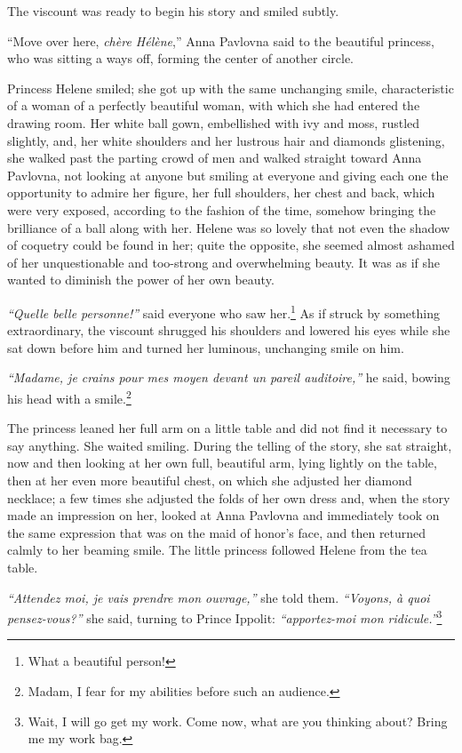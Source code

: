 The viscount was ready to begin his story and smiled subtly.

``Move over here, \textit{ch\`ere H\'el\`ene},'' Anna Pavlovna said to
the beautiful princess, who was sitting a ways off, forming the center
of another circle.

Princess Helene smiled; she got up with the same unchanging smile,
characteristic of a woman of a perfectly beautiful woman, with which
she had entered the drawing room. Her white ball gown, embellished
with ivy and moss, rustled slightly, and, her white shoulders and her
lustrous hair and diamonds glistening, she walked past the parting
crowd of men and walked straight toward Anna Pavlovna, not looking at
anyone but smiling at everyone and giving each one the opportunity to
admire her figure, her full shoulders, her chest and back, which were
very exposed, according to the fashion of the time, somehow bringing
the brilliance of a ball along with her. Helene was so lovely that not
even the shadow of coquetry could be found in her; quite the opposite,
she seemed almost ashamed of her unquestionable and too-strong and
overwhelming beauty. It was as if she wanted to diminish the power of
her own beauty.

\textit{``Quelle belle personne!''} said everyone who saw
her.\footnote{What a beautiful person!} As if struck by something
extraordinary, the viscount shrugged his shoulders and lowered his
eyes while she sat down before him and turned her luminous, unchanging
smile on him.

\textit{``Madame, je crains pour mes moyen devant un pareil
  auditoire,''} he said, bowing his head with a smile.\footnote{Madam,
  I fear for my abilities before such an audience.}

The princess leaned her full arm on a little table and did not find it
necessary to say anything. She waited smiling. During the telling of
the story, she sat straight, now and then looking at her own full,
beautiful arm, lying lightly on the table, then at her even more
beautiful chest, on which she adjusted her diamond necklace; a few
times she adjusted the folds of her own dress and, when the story made
an impression on her, looked at Anna Pavlovna and immediately took on
the same expression that was on the maid of honor's face, and then
returned calmly to her beaming smile. The little princess followed
Helene from the tea table.

\textit{``Attendez moi, je vais prendre mon ouvrage,''} she told
them. \textit{``Voyons, \`a quoi pensez-vous?''} she said, turning to
Prince Ippolit: \textit{``apportez-moi mon
  ridicule.''}\footnote{Wait, I will go get my work. Come now, what
  are you thinking about? Bring me my work bag.}

